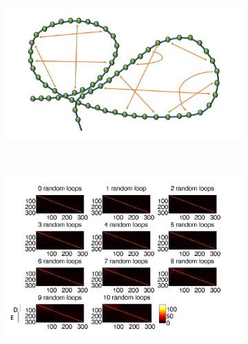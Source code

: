 \documentclass[12pt]{article}
\begin{document}
\begin{figure}[H]
\begin{subfigure}[b]{0.01\textwidth}
\includegraphics[scale=0.1]{polymerModelWithTwofixedLoopsAndInternalConnections}
\caption{}
\end{subfigure}
~~~~~~~~~~~~~~~~~~~~~~~~
\begin{subfigure}[b]{0.5\textwidth}
\includegraphics[scale=0.3]{EncounterHistogramsTwoFixedLoops0To10RandomLoops307Beads}
\caption{}
\end{subfigure}


\end{figure}
\end{document}
